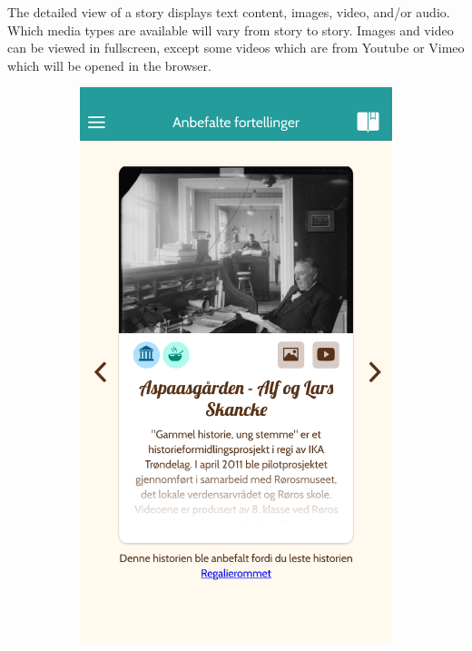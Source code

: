 \begin{appendices}
The detailed view of a story displays text content, images, video, and/or audio. Which media types are available will vary from story to story. Images and video can be viewed in fullscreen, except some videos which are from Youtube or Vimeo which will be opened in the browser.  
\begin{figure}[h!]
		\centering
		\begin{subfigure}[h]{0.32\textwidth}
			\includegraphics[width=\textwidth]{fig/screenshot_recommendations}

\end{subfigure}
\end{figure}
\end{appendices}
